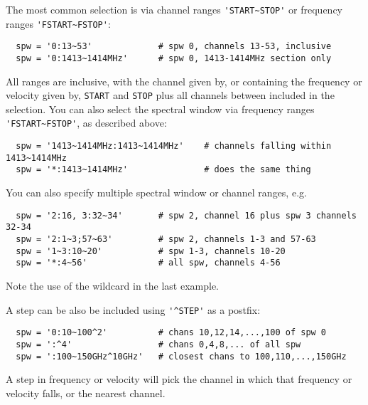 The most common selection is via channel ranges
{\verb!'START~STOP'!} or frequency ranges {\verb!'FSTART~FSTOP'!}:
\small
\begin{verbatim}
  spw = '0:13~53'             # spw 0, channels 13-53, inclusive
  spw = '0:1413~1414MHz'      # spw 0, 1413-1414MHz section only
\end{verbatim}
\normalsize
All ranges are inclusive, with the channel given by, or containing
the frequency or velocity given by, {\tt START} and {\tt STOP} plus
all channels between included in the selection.  You can also select
the spectral window via frequency ranges {\verb!'FSTART~FSTOP'!}, 
as described above:
\small
\begin{verbatim}
  spw = '1413~1414MHz:1413~1414MHz'    # channels falling within 1413~1414MHz
  spw = '*:1413~1414MHz'               # does the same thing
\end{verbatim}
\normalsize

You can also specify multiple spectral window or channel ranges, e.g.
\small
\begin{verbatim}
  spw = '2:16, 3:32~34'       # spw 2, channel 16 plus spw 3 channels 32-34
  spw = '2:1~3;57~63'         # spw 2, channels 1-3 and 57-63
  spw = '1~3:10~20'           # spw 1-3, channels 10-20
  spw = '*:4~56'              # all spw, channels 4-56
\end{verbatim}
\normalsize
Note the use of the wildcard in the last example.


A step can be also be included using {\verb!'^STEP'!} as a postfix:
\small
\begin{verbatim}
  spw = '0:10~100^2'          # chans 10,12,14,...,100 of spw 0
  spw = ':^4'                 # chans 0,4,8,... of all spw
  spw = ':100~150GHz^10GHz'   # closest chans to 100,110,...,150GHz
\end{verbatim}
\normalsize
A step in frequency or velocity will pick the channel in which that
frequency or velocity falls, or the nearest channel.

